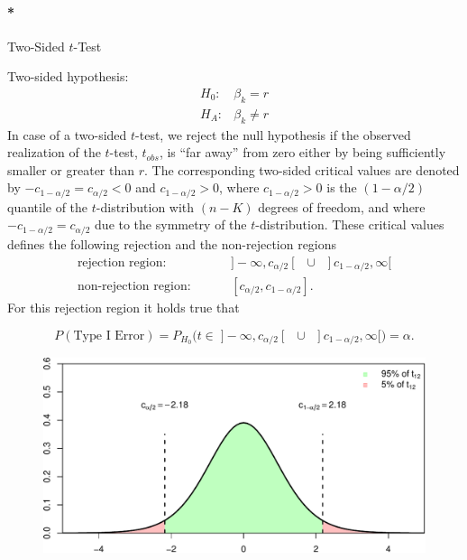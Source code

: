 \documentclass[
  letterpaper,
  DIV=11,
  numbers=noendperiod]{scrreprt}
\let\oldparagraph\paragraph
\renewcommand{\paragraph}[1]{\oldparagraph{#1}\mbox{}}
\theoremstyle{definition}
\theoremstyle{plain}
\theoremstyle{plain}
\theoremstyle{remark}
\begin{document}
\hypertarget{two-sided-t-test}{%
\paragraph*{\texorpdfstring{Two-Sided
\(t\)-Test}{Two-Sided t-Test}}\label{two-sided-t-test}}

Two-sided hypothesis: \begin{equation*}
\begin{array}{ll}
H_0: & \beta_k=r \\
H_A: & \beta_k\ne r
\end{array}
\end{equation*} In case of a two-sided \(t\)-test, we reject the null
hypothesis if the observed realization of the \(t\)-test, \(t_{obs}\),
is ``far away'' from zero either by being sufficiently smaller or
greater than \(r\). The corresponding two-sided critical values are
denoted by \(-c_{1-\alpha/2}=c_{\alpha/2}<0\) and \(c_{1-\alpha/2}>0\),
where \(c_{1-\alpha/2}>0\) is the \((1-\alpha/2)\) quantile of the
\(t\)-distribution with \((n-K)\) degrees of freedom, and where
\(-c_{1-\alpha/2}=c_{\alpha/2}\) due to the symmetry of the
\(t\)-distribution. These critical values defines the following
rejection and the non-rejection regions \begin{align*}
\text{rejection region:}&\hspace{1cm}]-\infty,c_{\alpha/2}[\;\;\cup\;\;]c_{1-\alpha/2}, \infty[\\
\text{non-rejection region:}&\hspace{1cm}[c_{\alpha/2},c_{1-\alpha/2}].
\end{align*} For this rejection region it holds true that

\[
P(\text{Type I Error})=P_{H_0}\Big(t\in\;]-\infty,c_{\alpha/2}[\;\;\cup\;\;]c_{1-\alpha/2}, \infty[\Big)=\alpha.
\]

\begin{figure}

{\centering \includegraphics{./05-Small-Sample-Inference_files/figure-pdf/unnamed-chunk-6-1.pdf}

}

\end{figure}
\end{document}
